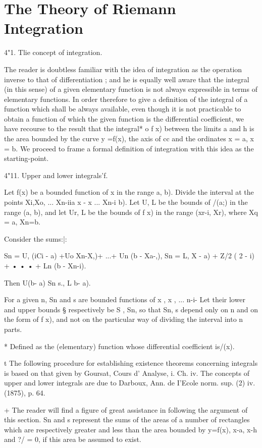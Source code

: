 \chapter{The Theory of Riemann Integration} 

4"1. Tlie concept of integration. 

The reader is doubtless familiar with the idea of integration as the 
operation inverse to that of differentiation ; and he is equally well aware that 
the integral (in this sense) of a given elementary function is not always 
expressible in terms of elementary functions. In order therefore to give 
a definition of the integral of a function which shall be always available, 
even though it is not practicable to obtain a function of which the given 
function is the differential coefficient, we have recourse to the result that the 
integral* o  f x) between the limits a and h is the area bounded by the 
curve y =f(x), the axis of cc and the ordinates x = a, x = b. We proceed to 
frame a formal definition of integration with this idea as the starting-point. 

4"11. Upper and lower integrals'f. 

Let f(x) be a bounded function of x in the range  a, b). Divide the 
interval at the points Xi,Xo, ... Xn-iia x - x  ...   Xn-i b). Let U, L be 
the bounds of /(a;) in the range (a, b), and let Ur, L  be the bounds of f x) 
in the range (xr-i, Xr), where Xq = a, Xn=b. 

Consider the sums:|: 

Sn = U, (iCi - a) +Uo Xn-X,)+ ...+ Un (b - Xa-,), 
Sn = L,  X  - a) + Z/2 ( 2 -  i) + • • • + Ln (b - Xn-i). 

Then U(b- a)   Sn   s.,  L b- a). 

For a given n, Sn and s  are bounded functions of x , x , ...  n-i- Let 
their lower and upper bounds § respectively be S , Sn, so that Sn, s  depend 
only on n and on the form of f x), and not on the particular way of dividing 
the interval into n parts. 

* Defined as the (elementary) function whose differential coefficient is/(x). 

t The following procedure for establishing existence theorems concerning integrals is based 
on that given by Goursat, Cours d' Analyse, i. Ch. iv. The concepts of upper and lower integrals 
are due to Darboux, Ann. de I'Ecole norm. sup. (2) iv. (1875), p. 64. 

+ The reader will find a figure of great assistance in following the argument of this section. 
Sn and s  represent the sums of the areas of a number of rectangles which are respectively 
greater and less than the area bounded by y=f(x), x-a, x-h and ?/ = 0, if this area be 
assumed to exist. 

